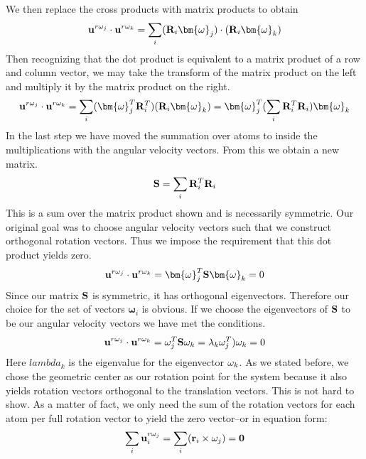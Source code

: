 We then replace the cross products with matrix products to obtain
\begin{equation}
   {\bf{u}}^{r\omega_j}\cdot {\bf{u}}^{r\omega_k}=\sum_i ({\bf{R}}_{i} {\bm{\omega}}_j) \cdot ({\bf{R}}_{i}{\bm{\omega}}_k)
\end{equation}
Then recognizing that the dot product is equivalent to a matrix product of a row and column vector, we may take the transform of the matrix product on the left and multiply it by the 
matrix product on the right.
\begin{equation}
 {\bf{u}}^{r\omega_j}\cdot {\bf{u}}^{r\omega_k}=\sum_i ( {\bm{\omega}}^T_j {\bf{R}}^T_{i})({\bf{R}}_{i} {\bm{\omega}}_k)= {\bm{\omega}}^T_j  (\sum_i {\bf{R}}^T_{i}{\bf{R}}_{i}) {\bm{\omega}}_k
\end{equation}
In the last step we have moved the summation over atoms to inside the multiplications with the angular velocity vectors.  
From this we obtain a new matrix.
\begin{equation}
{\bf{S}}= \sum_i {\bf{R}}^T_{i}{\bf{R}}_{i}
\end{equation}
This is a sum over the matrix product shown and is necessarily symmetric.  
Our original goal was to choose angular velocity vectors such that we construct orthogonal rotation vectors.  
Thus we impose 
the requirement that this dot product yields zero.  
\begin{equation}
{\bf{u}}^{r\omega_j}\cdot {\bf{u}}^{r\omega_k}= {\bm{\omega}}^T_j {\bf{S}} {\bm{\omega}}_k=0
\end{equation}
Since our matrix ${\bf{S}}$ is symmetric, it has orthogonal eigenvectors.  Therefore our choice for the set of vectors ${\bm{\omega}}_i$ is obvious.  If we choose the eigenvectors of ${\bf{S}}$ to be 
our angular velocity vectors we have met the conditions.
\begin{equation}
{\bf{u}}^{r\omega_j}\cdot {\bf{u}}^{r\omega_k}= {\bf{\omega}}^T_j {\bf{S}} {\bf{\omega}}_k=\lambda_k{\bf{\omega}}^T_j){\bf{\omega}}_k=0
\end{equation}
Here $lambda_k$ is the eigenvalue for the eigenvector ${\bf{\omega}}_k$.
As we stated before, we chose the geometric center as our rotation point for the system because it also yields rotation vectors orthogonal to the translation vectors.  
This is not hard to show. 
As a matter of fact, we only need the sum of the rotation vectors for each atom per full rotation vector to yield the zero vector--or in equation form:
\begin{equation}
\label{eq:sumtozero}
\sum_i {\bf{u}}^{r\omega_j}_i=\sum_i ({\bf{r}}_{i}\times {\bf{\omega}}_j)={\bf{0}}
\end{equation}
